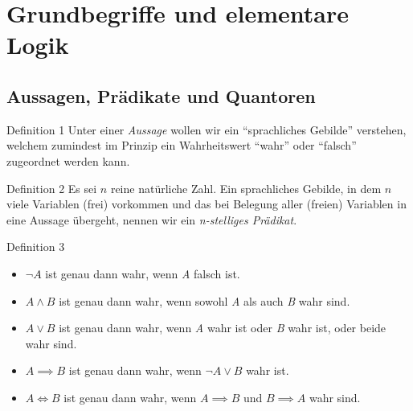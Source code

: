 \section{Grundbegriffe und elementare Logik}

	\subsection{Aussagen, Prädikate und Quantoren}
		\begin{definition}{Definition 1}
		Unter einer \textit{Aussage} wollen wir ein 
		``sprachliches Gebilde'' verstehen, welchem zumindest im 
		Prinzip ein Wahrheitswert ``wahr'' oder ``falsch'' 
		zugeordnet werden kann.
		\end{definition}

		\begin{definition}{Definition 2}
		Es sei $\mathit{n}$ reine natürliche Zahl. 
		Ein sprachliches Gebilde, in dem $\mathit{n}$ viele 
		Variablen (frei) vorkommen und das bei Belegung 
		aller (freien) Variablen in eine Aussage übergeht, 
		nennen wir ein \textit{n-stelliges Prädikat}.
		\end{definition}

		\begin{definition}{Definition 3}
			\begin{itemize}
			\item $\neg A$ ist genau dann wahr, wenn \textit{A} falsch ist.
			\item $A  \land B$ ist genau dann wahr, wenn sowohl 
			\textit{A} als auch \textit{B} wahr sind.
			\item $A \lor B$ ist genau dann wahr, wenn \textit{A} 
			wahr ist oder \textit{B} wahr ist, oder beide wahr sind.
			\item $A \implies B$ ist genau dann wahr, wenn 
			$\neg A \lor B$ wahr ist.
			\item $A \iff B$ ist genau dann wahr, wenn 
			$A \implies B$ und $B \implies A$ wahr sind.
			\end{itemize}
		\end{definition} 

